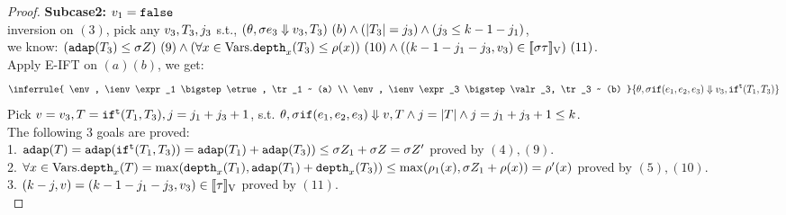 \documentclass[a4paper,11pt]{article}
\theoremstyle{definition}
\begin{document}
\begin{proof}
{\bf Subcase2:} $v_1 = \mathtt{false}$\\
%
inversion on $(3)$, pick any $v_3, T_3, j_3$ s.t., $(\theta, \sigma e_3 \mathrel{\Downarrow} v_3, T_3) ~ (b) \land (|T_3| = j_3) \land (j_3 \leq k-1-j_1)$,\\
%
we know: $(\mathtt{adap}(T_3) \leq \sigma Z) ~(9) \land (\forall x \in
\mbox{Vars}. \mathtt{depth}_{x}(T_3) \leq \rho(x))~(10) \land ((k -1-j_1- j_3, v_3) \in [\![ \sigma \tau ]\!]_{\text{V}})~(11)$.\\
%
Apply E-IFT on $(a) (b)$, we get:
\[
  \inferrule{
    \env, \ienv \expr_1 \bigstep \etrue, \tr_1 ~ (a) \\
    \env, \ienv \expr_3 \bigstep \valr_3, \tr_3 ~ (b)
  }{
    \env, \ienv \eif(\expr_1, \expr_2, \expr_3) \bigstep \valr_3, \trift(\tr_1, \tr_3)
  }
\]
Pick $v = v_3, T = \mathtt{if}^{\mathtt{t}}(T_1, T_3), j =j_1+ j_3+1$,  s.t. $\\
%
\env, \ienv \eif(\expr_1, \expr_2, \expr_3) \bigstep \valr, \tr \land j =
\size{\tr} \land j = j_1 + j_3+1 \leq \stepiA$.\\
%
The following 3 goals are proved:\\
%
1. $\mathtt{adap}(T) = \mathtt{adap}(\mathtt{if}^{\mathtt{t}}(T_1, T_3)) = \mathtt{adap}(T_1) +
\mathtt{adap}(T_3)) \leq \sigma Z_1 + \sigma Z = \sigma Z'$  proved by $(4),(9)$.\\
%
2. $\forall x \in \mbox{Vars}. \mathtt{depth}_{x}(T) = \max(\mathtt{depth}_{x}(T_1), \mathtt{adap}(T_1) +
\mathtt{depth}_{x}(T_3)) \leq \max(\rho_1(x), \sigma Z_1 + \rho(x)) =
\rho'(x) $ proved by $(5),(10)$.\\
%
3. $(k - j, v) = (k -1 - j_1-j_3, v_3) \in
[\![ \tau ]\!]_{\text{V}} $ proved by $(11)$.\\




\end{proof}
\end{document}
